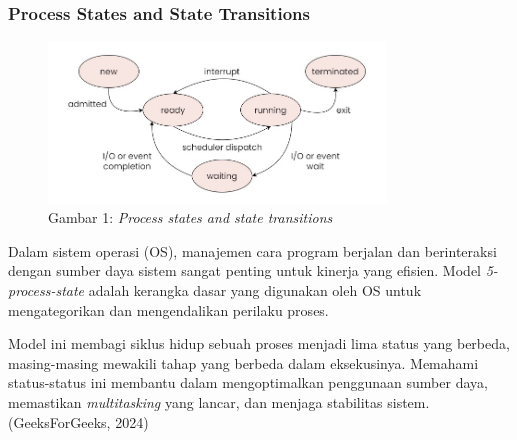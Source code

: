 \documentclass[12pt]{article}
\begin{document}
    \subsubsection{Process States and State Transitions}
        \begin{figure}[h]
            \centering
            \includegraphics[width=0.8\textwidth]{asset/process-state.jpg}
                        \caption{Gambar 1: \textit{Process states and state transitions}}
            \label{fig:process_state}
        \end{figure}

        Dalam sistem operasi (OS), manajemen cara program berjalan dan berinteraksi dengan sumber daya sistem sangat penting untuk kinerja yang efisien. Model \textit{5-process-state} adalah kerangka dasar yang digunakan oleh OS untuk mengategorikan dan mengendalikan perilaku proses.

        Model ini membagi siklus hidup sebuah proses menjadi lima status yang berbeda, masing-masing mewakili tahap yang berbeda dalam eksekusinya. Memahami status-status ini membantu dalam mengoptimalkan penggunaan sumber daya, memastikan \textit{multitasking} yang lancar, dan menjaga stabilitas sistem. (GeeksForGeeks, 2024)
\end{document}
